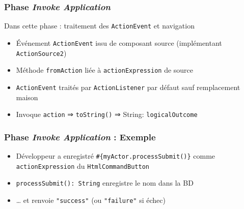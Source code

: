 \documentclass[english, french]{beamer}
\begin{document}
\begin{frame}[label=ph-ia]
	\frametitle{Phase \emph{Invoke Application}}
	Dans cette phase : traitement des \texttt{ActionEvent} et navigation
	\begin{itemize}
		\item Événement \texttt{ActionEvent} issu de composant \og{}source\fg{} {\tiny (implémentant \texttt{ActionSource2})}
		\item Méthode \texttt{fromAction} liée à \texttt{actionExpression} de \og{}source\fg{}
		\item \texttt{ActionEvent} traités par \texttt{ActionListener} par défaut {\tiny sauf remplacement maison}
		\item Invoque \texttt{action} {\tiny ⇒ \texttt{toString()}} ⇒ String: \texttt{logicalOutcome}
	\end{itemize}
\end{frame}

\begin{frame}
	\frametitle{Phase \emph{Invoke Application} : Exemple}
	\begin{itemize}
		\item Développeur a enregistré \texttt{\#\{myActor.processSubmit()\}} comme \texttt{actionExpression} du \texttt{HtmlCommandButton}
		\item \texttt{processSubmit(): String} enregistre le nom dans la BD
		\item … et renvoie \texttt{"success"} (ou \texttt{"failure"} si échec)
	\end{itemize}
\end{frame}
\end{document}
